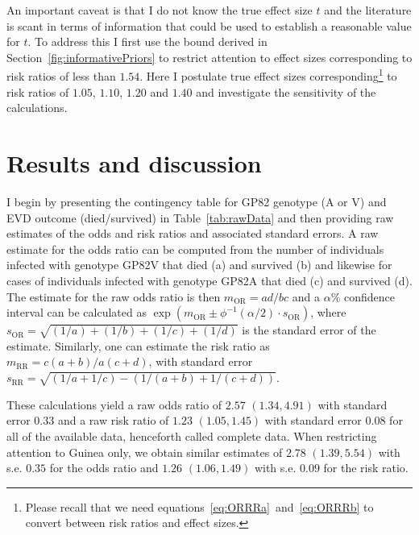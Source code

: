 An important caveat is that I do not know the true effect size $t$ and the literature is scant in terms of information that could be used to establish a reasonable value for $t$.
To address this I first use the bound derived in Section~\ref{fig:informativePriors} to restrict attention to effect sizes corresponding to risk ratios of less than $1.54$.
Here I postulate true effect sizes corresponding\footnote{Please recall that we need equations~\ref{eq:ORRRa}~and~\ref{eq:ORRRb} to convert between risk ratios and effect sizes.} to risk ratios of $1.05$, $1.10$, $1.20$ and $1.40$ and investigate the sensitivity of the calculations.
 
\section{Results and discussion}
\label{sec:results-discussion}

I begin by presenting the contingency table for GP82 genotype (A or V) and EVD outcome (died/survived) in Table~\ref{tab:rawData} and then providing raw estimates of the odds and risk ratios and associated standard errors.
A raw estimate for the odds ratio can be computed from the number of individuals infected with genotype GP82V that died (a) and survived (b) and likewise for cases of individuals infected with genotype GP82A that died (c) and survived (d).
The estimate for the raw odds ratio is then $m_{\text{OR}} = ad/bc$ and a $\alpha$\% confidence interval can be calculated as $\exp(m_{\text{OR}} \pm \phi^{-1}(\alpha/2) \cdot s_{\text{OR}})$, where $s_{\text{OR}} = \sqrt{(1/a) + (1/b) + (1/c) + (1/d)}$ is the standard error of the estimate.
Similarly, one can estimate the risk ratio as $m_{\text{RR}} = c(a + b)/a(c + d)$, with standard error $s_{\text{RR}} =  \sqrt{ (1/a + 1/c) - (1/(a + b) + 1/(c + d)) }$.

These calculations yield a raw odds ratio of $2.57$ $(1.34, 4.91)$ with standard error $0.33$ and a raw risk ratio of $1.23$ $(1.05, 1.45)$ with standard error $0.08$ for all of the available data, henceforth called complete data. 
When restricting attention to Guinea only, we obtain similar estimates of $2.78$ $(1.39, 5.54)$ with s.e. $0.35$  for the odds ratio and $1.26$ $(1.06, 1.49)$ with s.e. $0.09$ for the risk ratio. 


